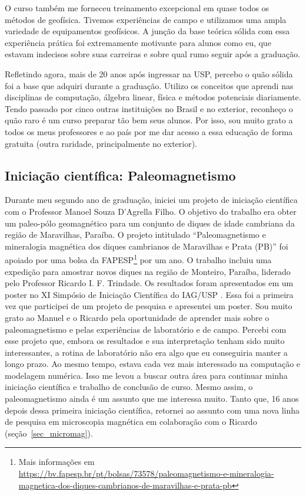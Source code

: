 \documentclass[12pt,a4paper,oneside]{book}
\begin{document}
O curso também me forneceu treinamento excepcional em quase todos os métodos de
geofísica.
Tivemos experiências de campo e utilizamos uma ampla variedade de equipamentos
geofísicos.
A junção da base teórica sólida com essa experiência prática foi
extremamente motivante para alunos como eu, que estavam indecisos sobre suas
carreiras e sobre qual rumo seguir após a graduação.

Refletindo agora, mais de 20 anos após ingressar na USP, percebo o quão sólida
foi a base que adquiri durante a graduação. Utilizo os conceitos que aprendi
nas disciplinas de computação, álgebra linear, física e métodos potenciais
diariamente. Tendo passado por cinco outras instituições no Brasil e no
exterior, reconheço o quão raro é um curso preparar tão bem seus alunos.
Por isso, sou muito grato a todos os meus professores e ao país por me dar
acesso a essa educação de forma gratuita (outra raridade, principalmente no
exterior).

\subsection{Iniciação científica: Paleomagnetismo}
\label{sec_ic_paleomag}

Durante meu segundo ano de graduação, iniciei um projeto de iniciação
científica com o Professor Manoel Souza D'Agrella Filho.
O objetivo do trabalho era obter um paleo-pólo geomagnético para um conjunto
de diques de idade cambriana da região de Maravilhas, Paraíba.
O projeto intitulado ``Paleomagnetismo e mineralogia magnética dos diques
cambrianos de Maravilhas e Prata (PB)'' foi apoiado por uma bolsa da
FAPESP\footnote{Mais informações em
\url{https://bv.fapesp.br/pt/bolsas/73578/paleomagnetismo-e-mineralogia-magnetica-dos-diques-cambrianos-de-maravilhas-e-prata-pb}}
por um ano.
O trabalho incluiu uma expedição para amostrar novos diques na região de
Monteiro, Paraíba, liderado pelo Professor Ricardo I. F. Trindade.
Os resultados foram apresentados em um poster no XI Simpósio de Iniciação
Científica do IAG/USP \citep{Uieda2006}.
Essa foi a primeira vez que participei de um projeto de pesquisa e apresentei
um poster.
Sou muito grato ao Manuel e o Ricardo pela oportunidade de aprender mais sobre
o paleomagnetismo e pelas experiências de laboratório e de campo.
Percebi com esse projeto que, embora os resultados e sua interpretação tenham
sido muito interessantes, a rotina de laboratório não era algo que eu
conseguiria manter a longo prazo.
Ao mesmo tempo, estava cada vez mais interessado na computação e modelagem
numérica.
Isso me levou a buscar outra área para continuar minha iniciação científica e
trabalho de conclusão de curso.
Mesmo assim, o paleomagnetismo ainda é um assunto que me interessa muito.
Tanto que, 16 anos depois dessa primeira iniciação científica, retornei
ao assunto com uma nova linha de pesquisa em microscopia magnética em
colaboração com o Ricardo \citep{SouzaJunior2024,SouzaJunior2025}
(seção~\ref{sec_micromag}).
\end{document}
